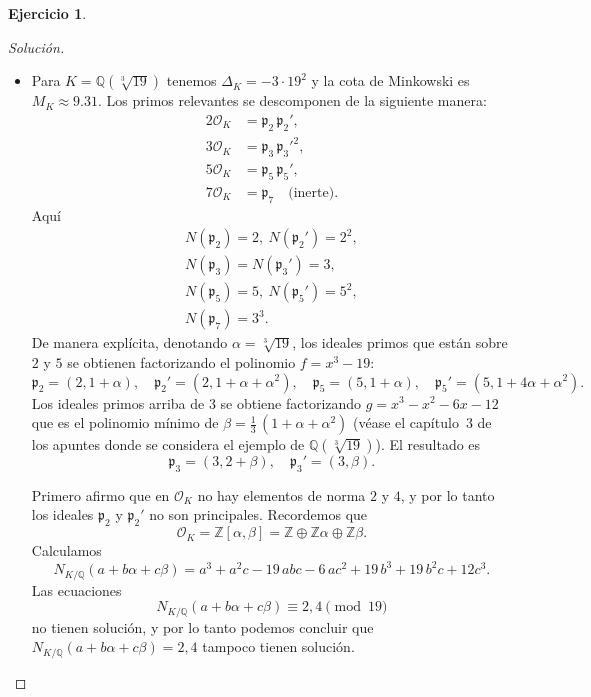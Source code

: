 \documentclass{article}
\newcounter{tarea}
\theoremstyle{definition}
\newtheorem{ejercicio}{Ejercicio}[tarea]
\newenvironment{solucion}{\begin{proof}[Solución]}{\end{proof}}
\newcommand{\ZZ}{\mathbb{Z}}
\newcommand{\QQ}{\mathbb{Q}}
\renewcommand{\O}{\mathcal{O}}
\begin{document}
\begin{ejercicio}
\begin{solucion}
\begin{itemize}
    \item Para $K = \QQ (\sqrt[3]{19})$ tenemos $\Delta_K = -3\cdot 19^2$ y la
      cota de Minkowski es $M_K \approx 9.31$. Los primos relevantes se
      descomponen de la siguiente manera:
      \begin{align*}
        2\O_K & = \mathfrak{p}_2\,\mathfrak{p}_2',\\
        3\O_K & = \mathfrak{p}_3\,\mathfrak{p}_3'^2,\\
        5\O_K & = \mathfrak{p}_5\,\mathfrak{p}_5',\\
        7\O_K & = \mathfrak{p}_7 \quad \text{(inerte)}.
      \end{align*}
      Aquí
      \begin{gather*}
        N (\mathfrak{p}_2) = 2, ~ N (\mathfrak{p}_2') = 2^2, \\
        N (\mathfrak{p}_3) = N (\mathfrak{p}_3') = 3, \\
        N (\mathfrak{p}_5) = 5, ~ N (\mathfrak{p}_5') = 5^2, \\
        N (\mathfrak{p}_7) = 3^3.
      \end{gather*}
      De manera explícita, denotando $\alpha = \sqrt[3]{19}$, los ideales primos
      que están sobre $2$ y $5$ se obtienen factorizando el polinomio
      $f = x^3 - 19$:
      \[ \mathfrak{p}_2 = (2, 1 + \alpha), \quad
        \mathfrak{p}_2' = (2, 1 + \alpha + \alpha^2), \quad
        \mathfrak{p}_5 = (5, 1 + \alpha), \quad
        \mathfrak{p}_5' = (5, 1 + 4\alpha + \alpha^2). \]
      Los ideales primos arriba de $3$ se obtiene factorizando
      $g = x^3 - x^2 - 6x - 12$ que es el polinomio mínimo de
      $\beta = \frac{1}{3}\,(1 + \alpha + \alpha^2)$ (véase el capítulo~3 de los
      apuntes donde se considera el ejemplo de $\QQ (\sqrt[3]{19})$).
      El resultado es
      \[ \mathfrak{p}_3 = (3, 2 + \beta), \quad
        \mathfrak{p}_3' = (3, \beta). \]

      Primero afirmo que en $\O_K$ no hay elementos de norma $2$ y $4$, y por lo
      tanto los ideales $\mathfrak{p}_2$ y $\mathfrak{p}_2'$ no son principales.
      Recordemos que
      $$\O_K = \ZZ [\alpha,\beta] = \ZZ \oplus \ZZ\alpha \oplus \ZZ\beta.$$
      Calculamos
      \[ N_{K/\QQ} (a + b\alpha + c\beta) =
        a^3 + a^2c - 19\,abc - 6\,ac^2 + 19\,b^3 + 19\,b^2c + 12c^3. \]
      Las ecuaciones
      $$N_{K/\QQ} (a + b\alpha + c\beta) \equiv 2,4 \pmod{19}$$
      no tienen solución, y por lo tanto podemos concluir que
      $N_{K/\QQ} (a + b\alpha + c\beta) = 2,4$ tampoco tienen solución.


\end{itemize}
\end{solucion}
\end{ejercicio}
\end{document}
